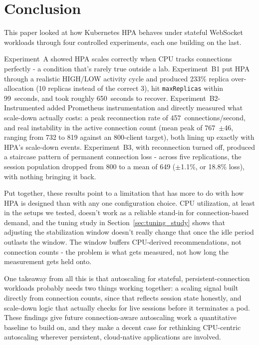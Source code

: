 \documentclass[twocolumn]{svjour3}
\begin{document}
\section{Conclusion}
\label{sec:conclusion}

This paper looked at how Kubernetes HPA behaves under stateful WebSocket workloads
through four controlled experiments, each one building on the last.

Experiment~A showed HPA scales correctly when CPU tracks connections perfectly -
a condition that's rarely true outside a lab. Experiment~B1 put HPA through a
realistic HIGH/LOW activity cycle and produced 233\% replica over-allocation (10 replicas
instead of the correct 3), hit \texttt{maxReplicas} within 99~seconds, and took
roughly 650~seconds to recover. Experiment~B2-Instrumented added Prometheus
instrumentation and directly measured what scale-down actually costs: a peak
reconnection rate of 457~connections/second, and real instability in the active
connection count (mean peak of 767~$\pm$46, ranging from 732 to 819 against an
800-client target), both lining up exactly with HPA's scale-down events.
Experiment~B3, with reconnection turned off, produced a staircase pattern of
permanent connection loss - across five replications, the session population
dropped from 800 to a mean of 649 ($\pm$1.1\%, or 18.8\% loss), with nothing
bringing it back.

Put together, these results point to a limitation that has more to do with how HPA
is designed than with any one configuration choice. CPU utilization, at least in
the setups we tested, doesn't work as a reliable stand-in for connection-based
demand, and the tuning study in Section~\ref{sec:tuning_study} shows that adjusting
the stabilization window doesn't really change that once the idle period outlasts
the window. The window buffers CPU-derived recommendations, not connection counts
- the problem is what gets measured, not how long the measurement gets held onto.

One takeaway from all this is that autoscaling for stateful, persistent-connection
workloads probably needs two things working together: a scaling signal built
directly from connection counts, since that reflects session state honestly, and
scale-down logic that actually checks for live sessions before it terminates a pod.
These findings give future connection-aware autoscaling work a quantitative
baseline to build on, and they make a decent case for rethinking CPU-centric
autoscaling wherever persistent, cloud-native applications are involved.
\end{document}
